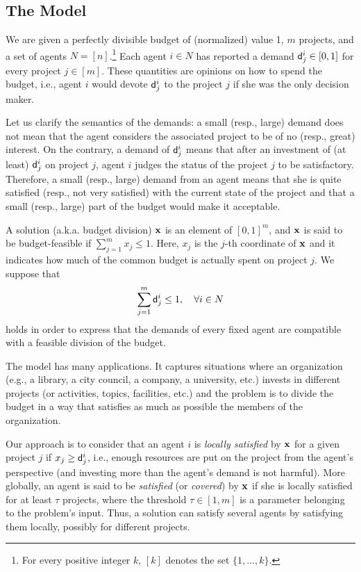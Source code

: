 \documentclass{article}
\begin{document}
\subsection{The Model}

We are given a perfectly divisible %
budget of (normalized) value 1,  $m$ projects, 
and a set of agents $N=[n]$.\footnote{For every positive integer $k$, $[k]$  denotes the set $\{1, \ldots,k\}$.}  
Each agent $i \in N$ has reported a demand ${\sf d}^i_j\in [0,1]$ for every project $j \in [m]$. These quantities are opinions on how to spend the budget, i.e., agent $i$  would devote ${\sf d}^i_j$ to the project $j$ if she was the only decision maker. 

Let us clarify the semantics of the demands: a small (resp., large) demand does not mean that the agent considers the associated project to be of no (resp., great) interest. On the contrary, a demand of ${\sf d}^i_j$ means that after an investment of (at least) ${\sf d}^i_j$ on project $j$, agent $i$ judges the status of the project $j$ to be satisfactory. Therefore, a small (resp., large) demand from an agent means that she is quite satisfied (resp., not very satisfied) with the current state of the project and that a small (resp., large) part of the budget would make it acceptable. 





A solution (a.k.a. budget division)  ${\bf x}$ is an element of $[0,1]^m$, and ${\bf x}$ is said to be  budget-feasible if $\sum_{j=1}^m x_j \le 1$. Here, $x_j$ is the $j$-th coordinate of ${\bf x}$ and it indicates how much of the common budget is actually spent on project $j$. We suppose that 
\begin{equation} \label{mass_l}
\sum_{j=1}^m {\sf d}^i_j \le 1, \quad \forall i \in N
\end{equation}
holds in order to express that the demands of every fixed agent are compatible with a feasible division of the budget. 
 
 




The model has many applications. It captures situations where an organization (e.g., a library, a city council, a company, a university, etc.) invests in different projects (or activities, topics, facilities, etc.) and the 
problem is to divide the budget in a way that satisfies as much as possible the members of the organization. 


Our approach is to consider that an agent $i$ is {\em locally satisfied} by ${\bf x}$ for a given project $j$ if  $x_j \ge {\sf d}^i_j$, i.e., enough resources are put on the project from the agent's perspective (and investing more than the agent's demand is not harmful). More globally, an agent is said to be {\em satisfied}  (or {\em covered}) by ${\bf x}$ if she is locally satisfied for at least $\tau$ projects, where the threshold $\tau \in [1,m]$ is a parameter belonging to the problem's input. Thus, a solution can satisfy several agents by satisfying them locally, possibly for different projects. %
\end{document}
